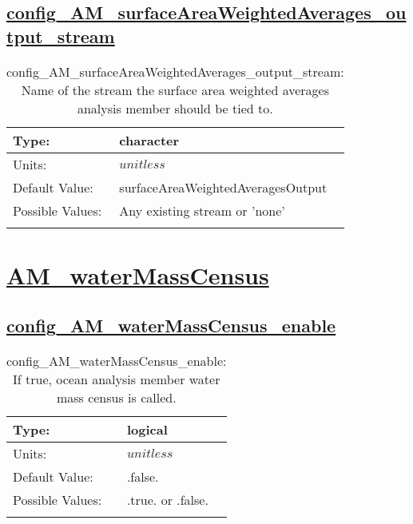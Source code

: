 \subsection[config\_AM\_surfaceAreaWeightedAverages\_output\_stream]{\hyperref[sec:nm_tab_AM_surfaceAreaWeightedAverages]{config\_AM\_surfaceAreaWeightedAverages\_output\_stream}}
\label{subsec:nm_sec_config_AM_surfaceAreaWeightedAverages_output_stream}
\begin{center}
\begin{longtable}{| p{2.0in} || p{4.0in} |}
    \hline
    Type: & character \\
    \hline
    Units: & $unitless$ \\
    \hline
    Default Value: & surfaceAreaWeightedAveragesOutput \\
    \hline
    Possible Values: & Any existing stream or 'none' \\
    \hline
    \caption{config\_AM\_surfaceAreaWeightedAverages\_output\_stream: Name of the stream the surface area weighted averages analysis member should be tied to.}
\end{longtable}
\end{center}
\section[AM\_waterMassCensus]{\hyperref[sec:nm_tab_AM_waterMassCensus]{AM\_waterMassCensus}}
\label{sec:nm_sec_AM_waterMassCensus}
\subsection[config\_AM\_waterMassCensus\_enable]{\hyperref[sec:nm_tab_AM_waterMassCensus]{config\_AM\_waterMassCensus\_enable}}
\label{subsec:nm_sec_config_AM_waterMassCensus_enable}
\begin{center}
\begin{longtable}{| p{2.0in} || p{4.0in} |}
    \hline
    Type: & logical \\
    \hline
    Units: & $unitless$ \\
    \hline
    Default Value: & .false. \\
    \hline
    Possible Values: & .true. or .false. \\
    \hline
    \caption{config\_AM\_waterMassCensus\_enable: If true, ocean analysis member water mass census is called.}
\end{longtable}
\end{center}
